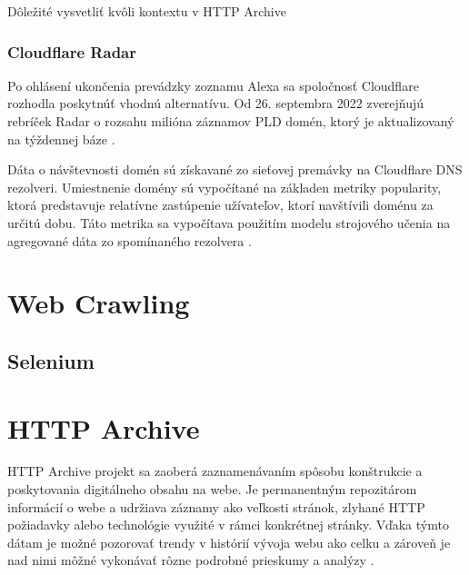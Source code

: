 Dôležité vysvetliť kvôli kontextu v HTTP Archive

\subsubsection{Cloudflare Radar}

Po ohlásení ukončenia prevádzky zoznamu Alexa sa spoločnosť Cloudflare rozhodla poskytnúť vhodnú alternatívu.
Od 26. septembra 2022 zverejňujú rebríček Radar o rozsahu milióna záznamov PLD domén, ktorý je aktualizovaný na týždennej báze \cite{tranco-methodology}.

Dáta o návštevnosti domén sú získavané zo sieťovej premávky na Cloudflare  DNS rezolveri. 
Umiestnenie domény sú vypočítané na základen metriky popularity, ktorá predstavuje relatívne zastúpenie užívateľov, ktorí navštívili doménu za určitú dobu. 
Táto metrika sa vypočítava použitím modelu strojového učenia na agregované dáta zo spomínaného rezolvera \cite{cloudflare-radar}. 


\section{Web Crawling}
\label{web-crawling}


\subsection{Selenium}
\label{selenium}


\section{HTTP Archive}
\label{httparchive}

HTTP Archive projekt sa zaoberá zaznamenávaním spôsobu konštrukcie a poskytovania digitálneho obsahu na webe. Je permanentným repozitárom informácií o webe a udržiava záznamy ako veľkosti
stránok, zlyhané HTTP požiadavky alebo technológie využité v rámci konkrétnej stránky. Vďaka týmto dátam je možné pozorovať trendy v histórií vývoja webu ako celku a zároveň je nad nimi môžné vykonávať
rôzne podrobné prieskumy a analýzy \cite{httparchive-about}. 

